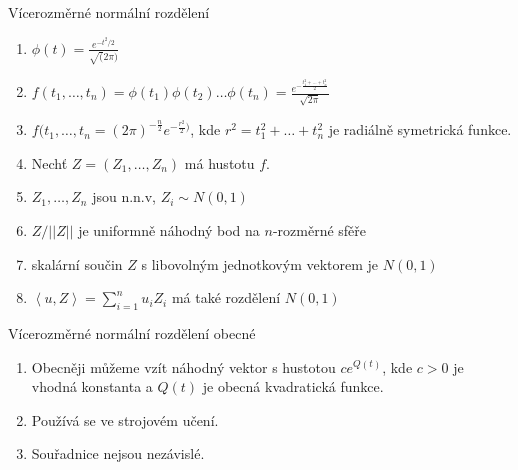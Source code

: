 \documentclass[../main.tex]{subfiles}
\begin{document}
Vícerozměrné normální rozdělení\\

\begin{enumerate}
    \item $\phi(t) = \frac{e^{-t^2/2}}{\sqrt(2\pi)}$
    \item $f(t_1,\dots, t_n) = \phi(t_1)\phi(t_2)\dots \phi(t_n) = \frac{e^{-\frac{t^2_1 + \dots + t^2_n}{2}}}{\sqrt{2\pi}}$
    \item $f(t_1,\dots, t_n = (2\pi)^{-\frac{n}{2}}e^{-\frac{r^2}{2})}$, kde $r^2 = t^2_1 + \dots + t^2_n$ je radiálně symetrická funkce.
    \item Nechť $Z = (Z_1,\dots, Z_n)$ má hustotu $f$.
    \item $Z_1,\dots,Z_n$ jsou n.n.v, $Z_i \sim N(0,1)$
    \item $Z/||Z||$ je uniformně náhodný bod na $n$-rozměrné sfěře
    \item skalární součin $Z$ s libovolným jednotkovým vektorem je $N(0,1)$
    \item $\left< u, Z \right> = \sum^n_{i=1} u_i Z_i$ má také rozdělení $N(0,1)$
\end{enumerate}

Vícerozměrné normální rozdělení obecné\\

\begin{enumerate}
    \item Obecněji můžeme vzít náhodný vektor s hustotou $ce^{Q(t)}$, kde $c > 0$ je vhodná konstanta a $Q(t)$ je obecná kvadratická funkce.
    \item Používá se ve strojovém učení.
    \item Souřadnice nejsou nezávislé.
\end{enumerate}
\end{document}
